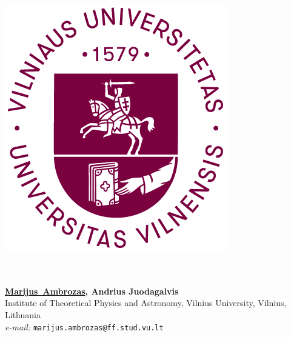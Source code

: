 \documentclass[a0,portrait]{a0poster}
\newcommand{\uline}[1]{\underline{#1}}
\begin{document}
\begin{minipage}[b]{0.1\linewidth}
\begin{flushleft}
\includegraphics[width=\linewidth]{VU_Logo_bordo.png}\\[0.5cm]$\phantom{x}$
\end{flushleft}
\end{minipage}
%
\hspace{1cm}
%
\begin{minipage}[b]{0.67\linewidth}
{
}\\ %
{\Large \textbf{\uline{Marijus\ Ambrozas},
 Andrius Juodagalvis}
}\\[0.5cm] %
Institute of Theoretical Physics and Astronomy, Vilnius University, Vilnius, Lithuania\\[0.4cm] %
{\small \textit{e-mail:} \texttt{marijus.ambrozas@ff.stud.vu.lt} }\\
\end{minipage}
\end{document}
